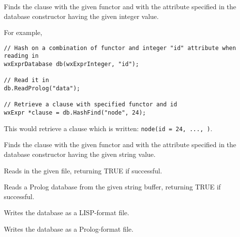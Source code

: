 
Finds the clause with the given functor and with the attribute specified
in the database constructor having the given integer value.

For example,

\begin{verbatim}
// Hash on a combination of functor and integer "id" attribute when reading in
wxExprDatabase db(wxExprInteger, "id");

// Read it in
db.ReadProlog("data");

// Retrieve a clause with specified functor and id
wxExpr *clause = db.HashFind("node", 24);
\end{verbatim}

This would retrieve a clause which is written: {\tt node(id = 24, ..., )}.


Finds the clause with the given functor and with the attribute specified
in the database constructor having the given string value.

\label{wxexprdatabaseread}


Reads in the given file, returning TRUE if successful.

\label{wxexprdatabasereadfromstring}


Reads a Prolog database from the given string buffer, returning TRUE if
successful.

\label{wxexprdatabasewritelisp}


Writes the database as a LISP-format file.

\label{wxexprdatabasewrite}


Writes the database as a Prolog-format file.


